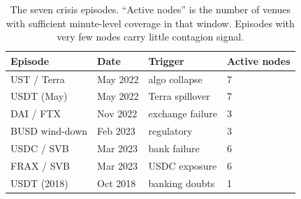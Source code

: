 \documentclass[sigconf,anonymous]{acmart}
\begin{document}
\begin{table}[t]
\caption{The seven crisis episodes. ``Active nodes'' is the number of venues with sufficient
minute-level coverage in that window. Episodes with very few nodes carry little contagion signal.}
\label{tab:episodes}
\small
\begin{tabular}{llll}
\toprule
Episode & Date & Trigger & Active nodes \\
\midrule
UST / Terra & May 2022 & algo collapse & 7 \\
USDT (May) & May 2022 & Terra spillover & 7 \\
DAI / FTX & Nov 2022 & exchange failure & 3 \\
BUSD wind-down & Feb 2023 & regulatory & 3 \\
USDC / SVB & Mar 2023 & bank failure & 6 \\
FRAX / SVB & Mar 2023 & USDC exposure & 6 \\
USDT (2018) & Oct 2018 & banking doubts & 1 \\
\bottomrule
\end{tabular}
\end{table}
\end{document}

